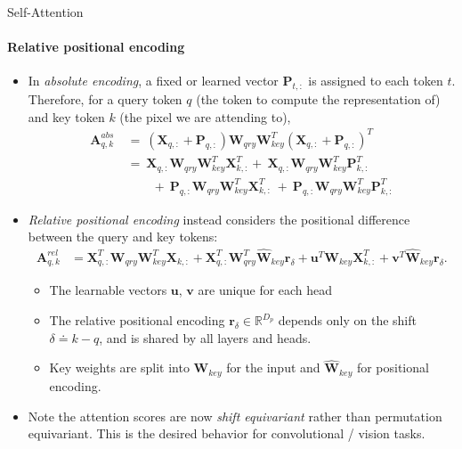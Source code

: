 \documentclass[9pt]{beamer}
\newcommand{\bb}{\mathbb}
\newcommand{\mb}{\bm}
\begin{document}
\newcommand{\WW}{ \mb W_{qry}\mb W_{key}^T }
\begin{frame}{Self-Attention}
\framesubtitle{Relative positional encoding}
\begin{itemize}
\item In {\em absolute encoding}, a fixed or learned vector $\bm P_{t,:}$ is assigned to each token $t$. Therefore, for a query token $q$ (the token to compute the representation of) and key token $k$ (the pixel we are attending to),
\begin{align}
    \mb A^{abs}_{q, k} 
        \ &=\ (\mb X_{q,:} + \mb P_{q,:})\WW(\mb X_{q,:} + \mb P_{q,:})^T 
        \nonumber
        \\ &=\ \mb X_{q,:}\WW\mb X^T_{k,:} +\ \mb X_{q,:}\WW\mb P^T_{k,:} 
        \\ &\qquad +\ \mb P_{q,:}\WW\mb X^T_{k,:} \ +\ \mb P_{q,:}\WW\mb P^T_{k,:} \nonumber 
\end{align}

\item \emph{Relative positional encoding} instead considers the positional difference between the query and key tokens:
\vspace{-.05in}
\begin{align}
    \mb A^{rel}_{q, k} &= 
        \mb X_{q,:}^T \WW \mb X_{k,:}
        + \mb X_{q,:}^T \mb W_{qry}^T\hat{\mb W}_{key} \mb r_{\delta}
        + \mb u^T \mb W_{key} \mb X^T_{k,:}
        + \mb v^T \hat{\mb W}_{key} \mb r_{\delta}.
    \label{relposenc}
\end{align}
\vspace{-.18in}
\begin{itemize}
    \item The learnable vectors $\bm u$, $\bm v$ are unique for each head 
    \item The relative positional encoding $\bm r_{\delta} \in \bb R^{D_p}$ depends only on the shift $\delta \doteq k -q$, and is shared by all layers and heads.
    \item Key weights are split into $\bm W_{key}$ for the input and $\hat{\bm W}_{key}$ for positional encoding.
\end{itemize}

\item Note the attention scores are now {\em shift equivariant} rather than permutation equivariant. This is the desired behavior for convolutional / vision tasks.
\end{itemize}
\end{frame}
\end{document}
